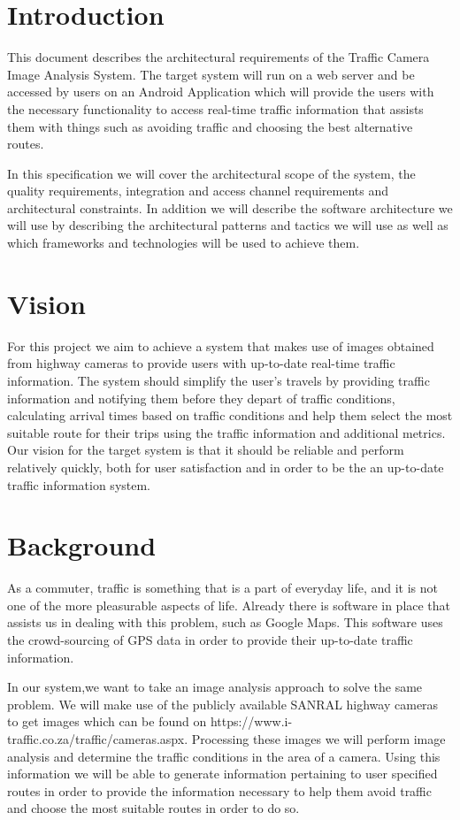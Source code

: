 \documentclass[a4paper,12pt]{article}
\begin{document}
\newpage
\tableofcontents
\newpage
\section{Introduction}
This document describes the architectural requirements of the Traffic Camera Image Analysis System. The target system will run on a web server  and be accessed by users on an Android Application which will provide the users with the necessary functionality to access real-time traffic information that assists them with things such as avoiding traffic and choosing the best alternative routes.

In this specification we will cover the architectural scope of the system, the quality requirements, integration and access channel requirements and architectural constraints. In addition we will describe the software architecture we will use by describing the architectural patterns and tactics we will use as well as which frameworks and technologies will be used to achieve them.
\section{Vision}
For this project we aim to achieve a system that makes use of images obtained from highway cameras to provide users with up-to-date real-time traffic information. The system should simplify the user's travels by providing traffic information and notifying them before they depart of traffic conditions, calculating arrival times based on traffic conditions and help them select the most suitable route for their trips using the traffic information and additional metrics. Our vision for the target system is that it should be reliable and perform relatively quickly, both for user satisfaction and in order to be the an up-to-date traffic information system.
\section{Background}
As a commuter, traffic is something that is a part of everyday life, and it is not one of the more pleasurable aspects of life. Already there is software in place that assists us in dealing with this problem, such as Google Maps. This software uses the crowd-sourcing of GPS data in order to provide their up-to-date traffic information.

In our system,we want to take an image analysis approach to solve the same problem. We will make use of the publicly available SANRAL highway cameras to get images which can be found on https://www.i-traffic.co.za/traffic/cameras.aspx. Processing these images we will perform image analysis and determine the traffic conditions in the area of a camera. Using this information we will be able to generate information pertaining to user specified routes in order to provide the information necessary to help them avoid traffic and choose the most suitable routes in order to do so.
\end{document}
